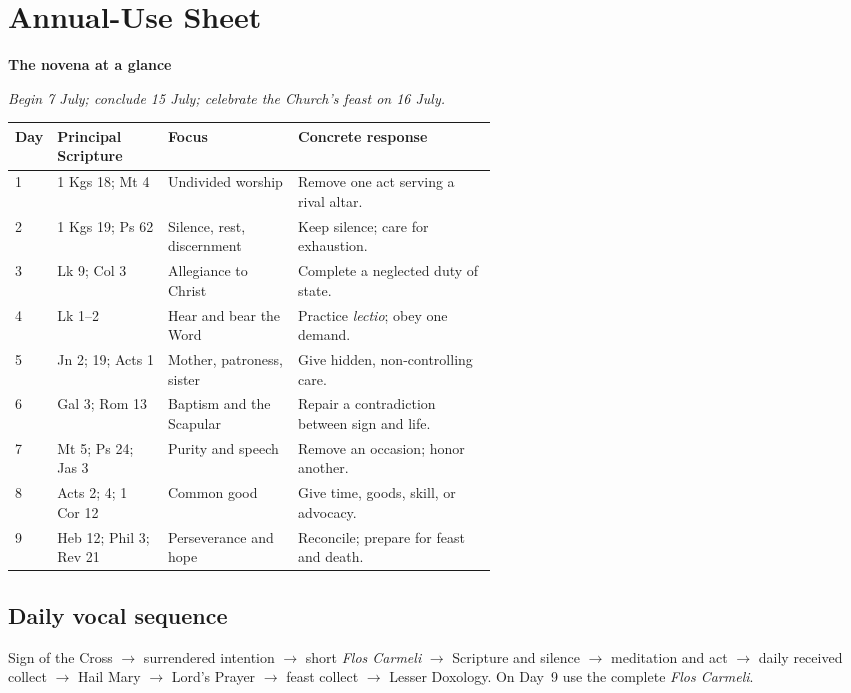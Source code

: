 \clearpage
\section{Annual-Use Sheet}

\begin{center}
{\Large\bfseries The novena at a glance}\par
\smallskip
{\itshape Begin 7 July; conclude 15 July; celebrate the Church's feast on 16 July.}\par
\end{center}

\begin{center}
\footnotesize
\begin{tabularx}{\linewidth}{@{}p{0.06\linewidth}p{0.23\linewidth}p{0.27\linewidth}X@{}}
\toprule
\textbf{Day} & \textbf{Principal Scripture} & \textbf{Focus} & \textbf{Concrete response}\\
\midrule
1 & 1 Kgs 18; Mt 4 & Undivided worship & Remove one act serving a rival altar.\\
2 & 1 Kgs 19; Ps 62 & Silence, rest, discernment & Keep silence; care for exhaustion.\\
3 & Lk 9; Col 3 & Allegiance to Christ & Complete a neglected duty of state.\\
4 & Lk 1--2 & Hear and bear the Word & Practice \textit{lectio}; obey one demand.\\
5 & Jn 2; 19; Acts 1 & Mother, patroness, sister & Give hidden, non-controlling care.\\
6 & Gal 3; Rom 13 & Baptism and the Scapular & Repair a contradiction between sign and life.\\
7 & Mt 5; Ps 24; Jas 3 & Purity and speech & Remove an occasion; honor another.\\
8 & Acts 2; 4; 1 Cor 12 & Common good & Give time, goods, skill, or advocacy.\\
9 & Heb 12; Phil 3; Rev 21 & Perseverance and hope & Reconcile; prepare for feast and death.\\
\bottomrule
\end{tabularx}
\end{center}

\subsection{Daily vocal sequence}

Sign of the Cross $\rightarrow$ surrendered intention $\rightarrow$ short \textit{Flos Carmeli} $\rightarrow$ Scripture and silence $\rightarrow$ meditation and act $\rightarrow$ daily received collect $\rightarrow$ Hail Mary $\rightarrow$ Lord's Prayer $\rightarrow$ feast collect $\rightarrow$ Lesser Doxology. On Day~9 use the complete \textit{Flos Carmeli}.

